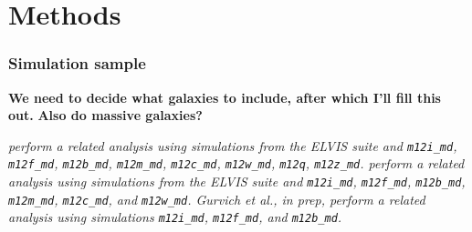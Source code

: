\documentclass[fleqn,usenatbib]{mnras}
\begin{document}






\section{Methods}
\label{s: methods}

\subsubsection{Simulation sample}
\label{s: methods -- simulations}

\textbf{We need to decide what galaxies to include, after which I'll fill this out.}
\textbf{Also do massive galaxies?}

\textit{
\cite{Garrison-Kimmel2018} perform a related analysis using simulations from the ELVIS suite and \texttt{m12i\_md}, \texttt{m12f\_md}, \texttt{m12b\_md}, \texttt{m12m\_md}, \texttt{m12c\_md}, \texttt{m12w\_md}, \texttt{m12q}, \texttt{m12z\_md}.
\cite{Yu2021} perform a related analysis using simulations from the ELVIS suite and \texttt{m12i\_md}, \texttt{m12f\_md}, \texttt{m12b\_md}, \texttt{m12m\_md}, \texttt{m12c\_md}, and \texttt{m12w\_md}.
Gurvich et al., in prep, perform a related analysis using simulations \texttt{m12i\_md}, \texttt{m12f\_md}, and \texttt{m12b\_md}.
}
\end{document}
